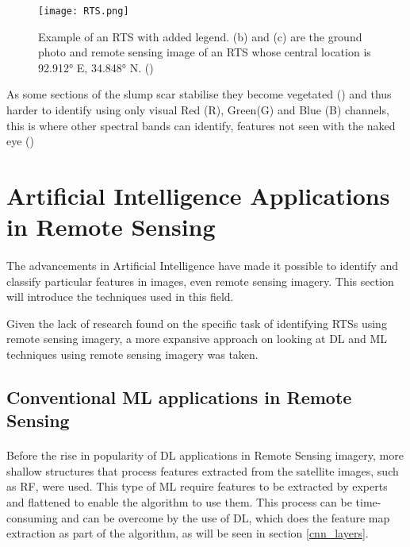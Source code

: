     \begin{figure}[hbt!]
        \centering
        \texttt{[image: RTS.png]}
        \caption{Example of an \gls{RTS} with added legend. (b) and (c) are the
ground photo and remote sensing image of an \gls{RTS} whose central location is 92.912° E, 34.848° N. (\cite{HUANG2020111534})}
        \label{fig_RTS}
    \end{figure}


As some sections of the slump scar stabilise they become vegetated (\cite{KOKELJ201556}) and thus harder to identify using only visual Red (R), Green(G) and Blue (B) channels, this is where other spectral bands can identify, features not seen with the naked eye (\cite{HUANG2020111534})
\section{Artificial Intelligence Applications in Remote Sensing}  \label{ai_rs}
\paragraph{}
The advancements in Artificial Intelligence have made it possible to identify and classify particular features in images, even remote sensing imagery. This section will introduce the techniques used in this field.

Given the lack of research found on the specific task of identifying \gls{RTS}s using remote sensing imagery, a more expansive approach on looking at \gls{DL} and \gls{ML} techniques using remote sensing imagery was taken.

\subsection{Conventional \gls{ML} applications in Remote Sensing}  \label{ml_rs}
\paragraph{}
Before the rise in popularity of \gls{DL} applications in Remote Sensing imagery, more shallow structures that process features extracted from the satellite images, such as \gls{RF}, were used. This type of \gls{ML} require features to be extracted by experts and flattened to enable the algorithm to use them. This process can be time-consuming and can be overcome by the use of \gls{DL}, which does the feature map extraction as part of the algorithm, as will be seen in section \ref{cnn_layers}.

